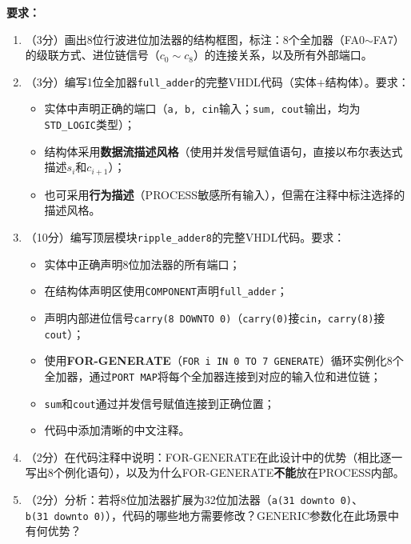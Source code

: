 \textbf{要求：}
\begin{enumerate}[label=(\arabic*)]
  \item （3分）画出8位行波进位加法器的结构框图，标注：8个全加器（FA0$\sim$FA7）的级联方式、进位链信号（$c_0\sim c_8$）的连接关系，以及所有外部端口。
  \item （3分）编写1位全加器\texttt{full\_adder}的完整VHDL代码（实体+结构体）。要求：
  \begin{itemize}
    \item 实体中声明正确的端口（\texttt{a, b, cin}输入；\texttt{sum, cout}输出，均为\texttt{STD\_LOGIC}类型）；
    \item 结构体采用\textbf{数据流描述风格}（使用并发信号赋值语句，直接以布尔表达式描述$s_i$和$c_{i+1}$）；
    \item 也可采用\textbf{行为描述}（PROCESS敏感所有输入），但需在注释中标注选择的描述风格。
  \end{itemize}
  \item （10分）编写顶层模块\texttt{ripple\_adder8}的完整VHDL代码。要求：
  \begin{itemize}
    \item 实体中正确声明8位加法器的所有端口；
    \item 在结构体声明区使用\texttt{COMPONENT}声明\texttt{full\_adder}；
    \item 声明内部进位信号\texttt{carry(8~DOWNTO~0)}（\texttt{carry(0)}接\texttt{cin}，\texttt{carry(8)}接\texttt{cout}）；
    \item 使用\textbf{FOR-GENERATE}（\texttt{FOR i IN 0 TO 7 GENERATE}）循环实例化8个全加器，通过\texttt{PORT MAP}将每个全加器连接到对应的输入位和进位链；
    \item \texttt{sum}和\texttt{cout}通过并发信号赋值连接到正确位置；
    \item 代码中添加清晰的中文注释。
  \end{itemize}
  \item （2分）在代码注释中说明：FOR-GENERATE在此设计中的优势（相比逐一写出8个例化语句），以及为什么FOR-GENERATE\textbf{不能}放在PROCESS内部。
  \item （2分）分析：若将8位加法器扩展为32位加法器（\texttt{a(31~downto~0)}、\texttt{b(31~downto~0)}），代码的哪些地方需要修改？GENERIC参数化在此场景中有何优势？
\end{enumerate}

